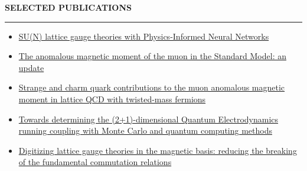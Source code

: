 \documentclass[
  18,
]{article}
\begin{document}
\begin{large}{\bf SELECTED PUBLICATIONS}
  \vspace{9pt}
  \hrule
  \vspace{9pt}

   \begin{itemize}
     \item \href{https://inspirehep.net/literature/3075565}{SU(N) lattice gauge theories with Physics-Informed Neural Networks}
     \item \href{https://inspirehep.net/literature/2925594}{The anomalous magnetic moment of the muon in the Standard Model: an update}
     \item \href{https://inspirehep.net/literature/2847988}{Strange and charm quark contributions to the muon anomalous magnetic moment in lattice QCD with twisted-mass fermions}
     \item \href{https://inspirehep.net/literature/2781250}{Towards determining the (2+1)-dimensional Quantum Electrodynamics running coupling with Monte Carlo and quantum computing methods}
     \item \href{https://inspirehep.net/literature/2724218}{Digitizing lattice gauge theories in the magnetic basis: reducing the breaking of the fundamental commutation relations}
   \end{itemize}

\end{large}

\vspace{9pt}
\end{document}
